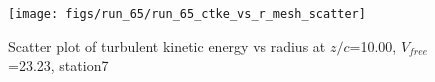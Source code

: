 \begin{figure}[H]
\centering
\texttt{[image: figs/run\_65/run\_65\_ctke\_vs\_r\_mesh\_scatter]}
\caption{Scatter plot of turbulent kinetic energy vs radius at $z/c$=10.00, $V_{free}$=23.23, station7}
\label{fig:run_65_ctke_vs_r_mesh_scatter}
\end{figure}



